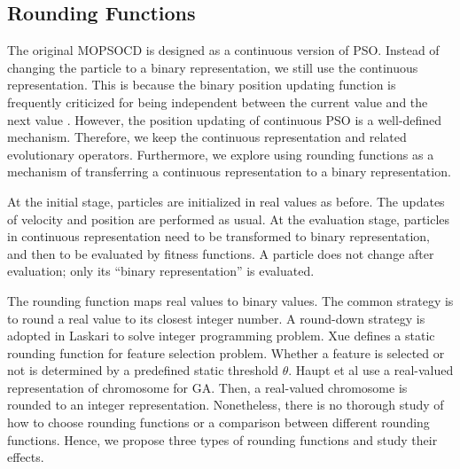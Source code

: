 \documentclass[10pt,journal,compsoc]{IEEEtran}
\begin{document}
\vspace{-3 mm}
\subsection{Rounding Functions}

The original MOPSOCD is designed as a continuous version of PSO. Instead of changing the particle to a binary representation, we still use the continuous representation. This is because the binary position updating function is frequently criticized for being independent between the current value and the next value \cite{khanesar2007novel}. However, the position updating of continuous PSO is a well-defined mechanism. Therefore, we keep the continuous representation and related evolutionary operators. Furthermore, we explore using rounding functions as a mechanism of transferring a continuous representation to a binary representation.


At the initial stage, particles are initialized in real values as before. The updates of velocity and position are performed as usual. At the evaluation stage, particles in continuous representation need to be transformed to binary representation, and then to be evaluated by fitness functions. A particle does not change after evaluation; only its ``binary representation'' is evaluated. 

The rounding function maps real values to binary values. The common strategy is to round a real value to its closest integer number. A round-down strategy is adopted in Laskari \cite{1004478} to solve integer programming problem. Xue \cite{xue2013particle} defines a static rounding function for feature selection problem. Whether a feature is selected or not is determined by a predefined static threshold $\theta$. Haupt et al\cite{4120263} use a real-valued representation of chromosome for GA. Then, a real-valued chromosome is rounded to an integer representation. Nonetheless, there is no thorough study of how to choose rounding functions or a comparison between different rounding functions. Hence, we propose three types of rounding functions and study their effects.
\end{document}
